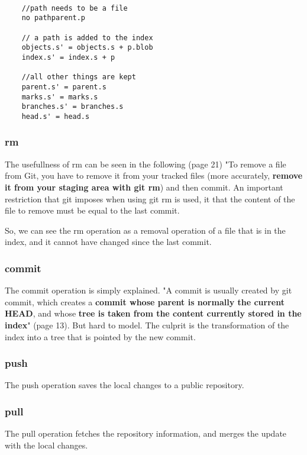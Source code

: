 \begin{lstlisting}

	//path needs to be a file
	no pathparent.p

	// a path is added to the index
	objects.s' = objects.s + p.blob
	index.s' = index.s + p

	//all other things are kept
	parent.s' = parent.s
	marks.s' = marks.s
	branches.s' = branches.s
	head.s' = head.s 

\end{lstlisting}

\subsubsection{rm}

The usefullness of rm can be
seen in the following \cite{progit}
(page 21) "To remove a file from Git, you have to remove it
from your tracked files (more accurately, {\bf remove it from your
staging area with git rm}) and then commit.
An important restriction that git imposes when using git rm is used,
it that the
content of the file to remove must be equal to the last commit. \par
So, we can see the rm operation as a removal operation of a file
that is in the index, and it cannot have changed since the last
commit. \par


\subsubsection{commit}

The commit operation is simply explained. 
"A commit is usually created by git commit, which creates a {\bf commit whose parent is 
normally the current HEAD}, and whose {\bf tree is taken from the content currently stored
in the index}" \cite{gitComm} (page 13).
But hard to model. The culprit is the transformation of the index into a tree that is pointed
by the new commit.

\subsubsection{push}
The push operation saves the local changes to a public repository.  

\subsubsection{pull}
The pull operation fetches the repository information, and merges the update with the local
changes.
